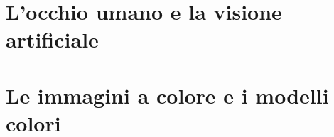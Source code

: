 \documentclass[12 pt]{article}
\begin{document}

\tableofcontents

\section{L'occhio umano e la visione artificiale}


\section{Le immagini a colore e i modelli colori}

\end{document}
